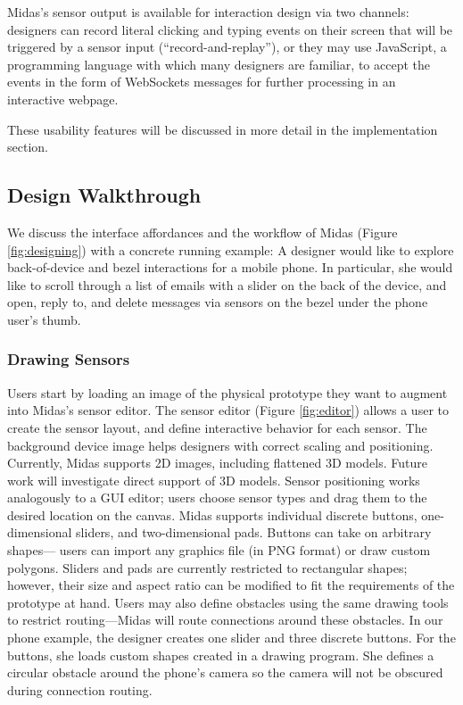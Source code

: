 Midas's sensor output is available for interaction design via two channels: designers can record literal clicking and typing events on their screen that will be triggered by a sensor input (``record-and-replay''), or they may use JavaScript, a programming language with which many designers are familiar, to accept the events in the form of WebSockets messages for further processing in an interactive webpage.

These usability features will be discussed in more detail in the implementation section.

    \subsection{Design Walkthrough}
    
    We discuss the interface affordances and the
workflow of Midas (Figure \ref{fig:designing}) with a concrete running example:
A designer would like to explore back-of-device and
bezel interactions for a mobile phone. In particular, she
would like to scroll through a list of emails with a slider on
the back of the device, and open, reply to, and delete messages
via sensors on the bezel under the phone user's thumb.

        \subsubsection{Drawing Sensors}
Users start by loading an image of the physical prototype
they want to augment into Midas's sensor editor. The sensor
editor (Figure \ref{fig:editor}) allows a user to create the sensor layout, and
define interactive behavior for each sensor. The background
device image helps designers with correct scaling and positioning.
Currently, Midas supports 2D images, including
flattened 3D models. Future work will investigate direct support
of 3D models. Sensor positioning works analogously
to a GUI editor; users choose sensor types and drag them to the desired location on the canvas. Midas supports individual
discrete buttons, one-dimensional sliders, and two-dimensional
pads. Buttons can take on arbitrary shapes---
users can import any graphics file (in PNG format) or draw
custom polygons. Sliders and pads are currently restricted
to rectangular shapes; however, their size and aspect ratio
can be modified to fit the requirements of the prototype at
hand. Users may also define obstacles using the same drawing
tools to restrict routing---Midas will route connections
around these obstacles.
In our phone example, the designer creates one slider and
three discrete buttons. For the buttons, she loads custom
shapes created in a drawing program. She defines a circular
obstacle around the phone's camera so the camera will
not be obscured during connection routing.


